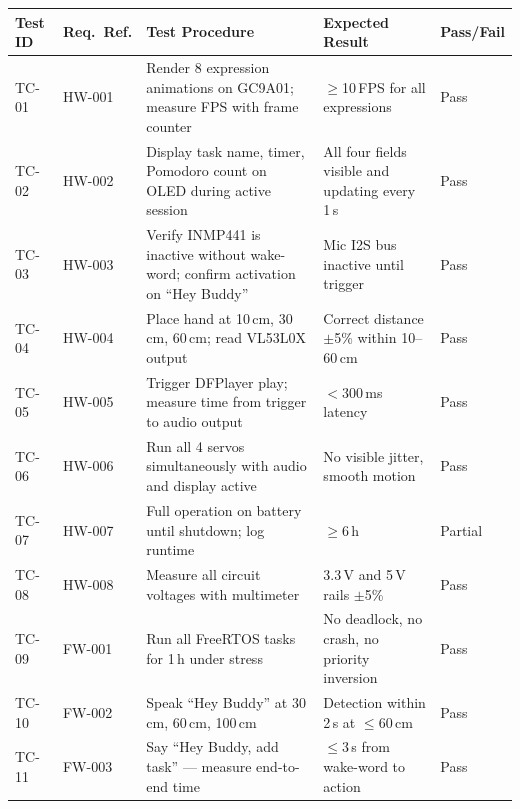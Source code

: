 \documentclass[12pt,a4paper]{article}
\begin{document}
\begin{center}
\label{tab:tests}
\scriptsize
\begin{tabular}{|C{0.06\textwidth}|C{0.07\textwidth}|L{0.30\textwidth}|L{0.25\textwidth}|C{0.08\textwidth}|}
\hline
\textbf{Test ID} & \textbf{Req.\ Ref.} & \textbf{Test Procedure} &
\textbf{Expected Result} & \textbf{Pass/Fail} \\ \hline
TC-01 & HW-001 & Render 8 expression animations on GC9A01; measure
                  FPS with frame counter & $\geq$10\,FPS for all
                  expressions & Pass \\ \hline
TC-02 & HW-002 & Display task name, timer, Pomodoro count on OLED
                  during active session & All four fields visible and
                  updating every 1\,s & Pass \\ \hline
TC-03 & HW-003 & Verify INMP441 is inactive without wake-word;
                  confirm activation on ``Hey Buddy'' & Mic I2S bus
                  inactive until trigger & Pass \\ \hline
TC-04 & HW-004 & Place hand at 10\,cm, 30\,cm, 60\,cm; read VL53L0X
                  output & Correct distance $\pm$5\% within
                  10--60\,cm & Pass \\ \hline
TC-05 & HW-005 & Trigger DFPlayer play; measure time from trigger to
                  audio output & $<$300\,ms latency & Pass \\ \hline
TC-06 & HW-006 & Run all 4 servos simultaneously with audio and
                  display active & No visible jitter, smooth
                  motion & Pass \\ \hline
TC-07 & HW-007 & Full operation on battery until shutdown; log
                  runtime & $\geq$6\,h & Partial \\ \hline
TC-08 & HW-008 & Measure all circuit voltages with multimeter &
                  3.3\,V and 5\,V rails $\pm$5\% & Pass \\ \hline
TC-09 & FW-001 & Run all FreeRTOS tasks for 1\,h under stress &
                  No deadlock, no crash, no priority inversion & Pass \\ \hline
TC-10 & FW-002 & Speak ``Hey Buddy'' at 30\,cm, 60\,cm, 100\,cm &
                  Detection within 2\,s at $\leq$60\,cm & Pass \\ \hline
TC-11 & FW-003 & Say ``Hey Buddy, add task'' --- measure end-to-end
                  time & $\leq$3\,s from wake-word to action & Pass \\ \hline

\end{tabular}
\end{center}
\end{document}

